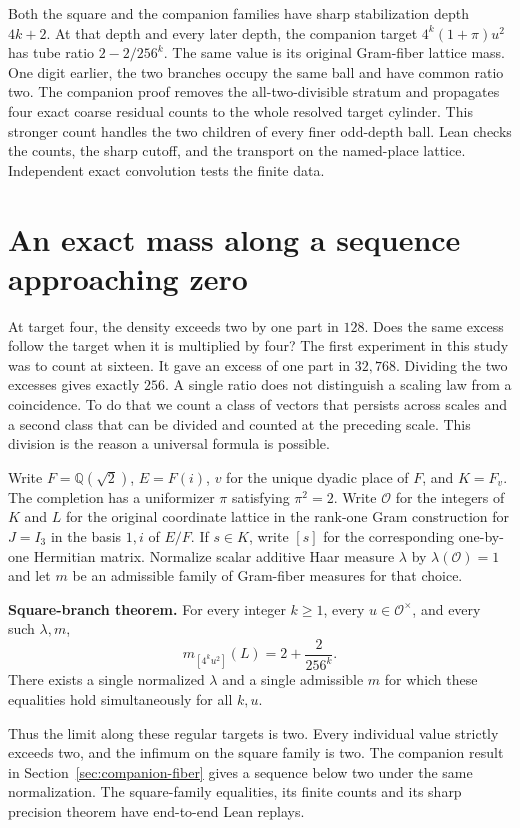\documentclass[12pt,letterpaper]{article}
\newcommand{\ruleline}{\par\vspace{1pt}{\color{accent}\rule{\linewidth}{.35pt}}\par}
\begin{document}
\par
Both the square and the companion families have sharp stabilization depth $4k+2$. At that depth and every later depth, the companion target $4^k(1+\pi)u^2$ has tube ratio $2-2/256^k$. The same value is its original Gram-fiber lattice mass. One digit earlier, the two branches occupy the same ball and have common ratio two. The companion proof removes the all-two-divisible stratum and propagates four exact coarse residual counts to the whole resolved target cylinder. This stronger count handles the two children of every finer odd-depth ball. Lean checks the counts, the sharp cutoff, and the transport on the named-place lattice. Independent exact convolution tests the finite data.
\clearpage
\makeatletter
\begingroup\small\setlength{\parskip}{0pt}
\renewcommand*{\l@section}[2]{\addvspace{3pt}\@dottedtocline{1}{0em}{1.9em}{#1}{#2}}
\tableofcontents\endgroup
\makeatother
\clearpage{}
\section{An exact mass along a sequence approaching zero}
At target four, the density exceeds two by one part in $128$. Does the same excess follow the target when it is multiplied by four? The first experiment in this study was to count at sixteen. It gave an excess of one part in $32{,}768$. Dividing the two excesses gives exactly $256$. A single ratio does not distinguish a scaling law from a coincidence. To do that we count a class of vectors that persists across scales and a second class that can be divided and counted at the preceding scale. This division is the reason a universal formula is possible.

Write $F=\mathbb Q(\sqrt2)$, $E=F(i)$, $v$ for the unique dyadic place of $F$, and $K=F_v$. The completion has a uniformizer $\pi$ satisfying $\pi^2=2$. Write $\mathcal O$ for the integers of $K$ and $L$ for the original coordinate lattice in the rank-one Gram construction for $J=I_3$ in the basis $1,i$ of $E/F$. If $s\in K$, write $[s]$ for the corresponding one-by-one Hermitian matrix. Normalize scalar additive Haar measure $\lambda$ by $\lambda(\mathcal O)=1$ and let $m$ be an admissible family of Gram-fiber measures for that choice.

\begin{center}\begin{minipage}{.93\linewidth}\ruleline
\textbf{Square-branch theorem.} For every integer $k\geq1$, every $u\in\mathcal O^\times$, and every such $\lambda,m$,
\[
       m_{[4^k u^2]}(L)=2+\frac{2}{256^k}.
\]
There exists a single normalized $\lambda$ and a single admissible $m$ for which these equalities hold simultaneously for all $k,u$.
\ruleline\end{minipage}\end{center}
Thus the limit along these regular targets is two. Every individual value strictly exceeds two, and the infimum on the square family is two. The companion result in Section~\ref{sec:companion-fiber} gives a sequence below two under the same normalization. The square-family equalities, its finite counts and its sharp precision theorem have end-to-end Lean replays.
\end{document}
